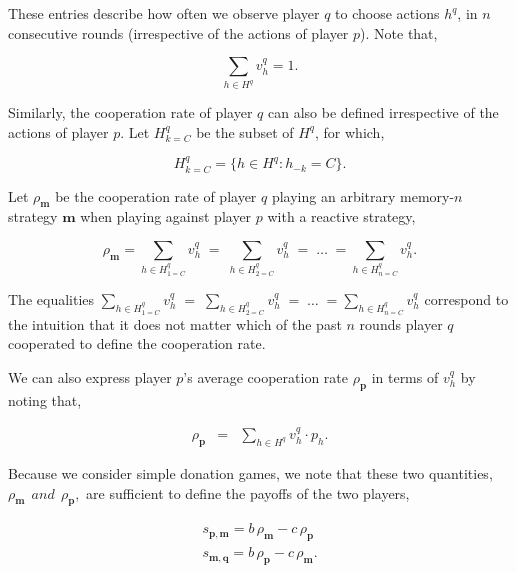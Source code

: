 \documentclass{article}
\theoremstyle{definition}
\begin{document}
These entries describe how often we observe player $q$ to choose actions $h^q$,
in $n$ consecutive rounds (irrespective of the actions of player $p$).
Note that,


\begin{equation}\label{eq:normalization_marginal_distributions}
  \displaystyle \sum_{h \in H^q} v^q_{h} = 1.
\end{equation}


Similarly, the cooperation rate of player $q$ can also be defined irrespective
of the actions of player $p$. Let $H^{q}_{k=C}$ be the subset of $H^{q}$, for which,

\begin{equation}
  H^{q}_{k=C} = \{h \in H^q : h_{-k} = C\}.
\end{equation}

Let $\rho_\mathbf{m}$ be the cooperation rate of
player $q$ playing an arbitrary memory-$n$ strategy $\mathbf{m}$ when playing
against player $p$ with a reactive strategy,

\begin{equation}
  \rho_\mathbf{m} = \sum_{h \in H^{q}_{1=C}} v^q_{h} \; = \; \sum_{h \in H^{q}_{2=C}} v^q_{h} \; = \; \dots \; = \sum_{h \in H^{q}_{n=C}} v^q_{h}.
\end{equation}

The equalities $\displaystyle \sum_{h \in H^{q}_{1=C}} v^q_{h} \; = \; \sum_{h \in
H^{q}_{2=C}} v^q_{h} \; = \; \dots \; = \sum_{h \in H^{q}_{n=C}} v^q_{h}$
correspond to the intuition that it does not matter which of the past $n$ rounds
player $q$ cooperated to define the cooperation rate.

We can also express player $p$'s average cooperation rate $\rho_\mathbf{p}$ in terms
of $v^q_{h}$ by noting that,

\begin{equation} \label{Eq:rhop_alln}
  \begin{array}{lll}
    \rho_\mathbf{p} &= &\displaystyle \sum_{h \in H^q} v^q_{h} \cdot p_{h}.
  \end{array}
\end{equation}

Because we consider simple donation games, we note that these two quantities,
$\rho_\mathbf{m}  ~~and~~ \rho_\mathbf{p},$ are
sufficient to define the payoffs of the two players,

\begin{equation} \label{Eq:payoff}
  \begin{array}{lll}
  s_{\mathbf{p}, \mathbf{m}}  =  b\, \rho_\mathbf{m} - c\, \rho_\mathbf{p}\\
  s_{\mathbf{m}, \mathbf{q}} = b\, \rho_\mathbf{p} - c\, \rho_\mathbf{m}.
  \end{array}
\end{equation}
\end{document}
